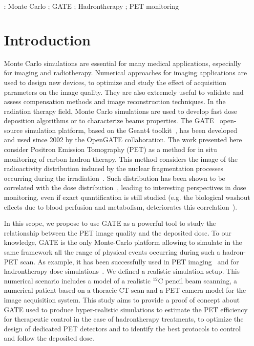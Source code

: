\documentclass[11pt]{iopart}
\begin{document}
\vspace{2pc}
: Monte Carlo ; GATE ; Hadrontherapy ; PET monitoring
\maketitle


\section{Introduction}

Monte Carlo simulations are essential for many medical applications,
especially for imaging and radiotherapy. Numerical approaches for
imaging applications are used to design new devices, to optimize and
study the effect of acquisition parameters on the image quality. They
are also extremely useful to validate and assess compensation methods
and image reconstruction techniques. In the radiation therapy field,
Monte Carlo simulations are used to develop fast dose deposition
algorithms or to characterize beams properties. The
GATE~\cite{Jan2004, Jan2011} open-source simulation platform, based on
the Geant4 toolkit~\cite{Allison2006, Agostinelli2003}, has been
developed and used since 2002 by the OpenGATE collaboration.
The work presented here consider Positron Emission Tomography (PET) as
a method for in situ monitoring of carbon hadron therapy. This method
considers the image of the radioactivity distribution induced by the
nuclear fragmentation processes occurring during the
irradiation~\cite{Enghardt1999}. Such distribution has been shown to
be correlated with the dose distribution~\cite{Moteabbed2011}, leading
to interesting perspectives in dose monitoring, even if exact
quantification is still studied (e.g. the biological washout effects
due to blood perfusion and metabolism, deteriorates this
correlation~\cite{Parodi2008}).

In this scope, we propose to use GATE as a powerful tool to study the
relationship between the PET image quality and the deposited dose. To
our knowledge, GATE is the only Monte-Carlo platform allowing to
simulate in the same framework all the range of physical events
occurring during such a hadron-PET scan. As example, it has been
successfully used in PET imaging~\cite{Buvat2006a} and for
hadrontherapy dose simulations~\cite{Jan2011, Grevillot2011a}. We
defined a realistic simulation setup. This numerical scenario includes
a model of a realistic $^{12}$C pencil beam scanning, a numerical
patient based on a thoracic CT scan and a PET camera model for the
image acquisition system. This study aims to provide a proof of
concept about GATE used to produce hyper-realistic simulations to
estimate the PET efficiency for therapeutic control in the case of
hadrontherapy treatments, to optimize the design of dedicated PET
detectors and to identify the best protocols to control and follow the
deposited dose.
\end{document}
